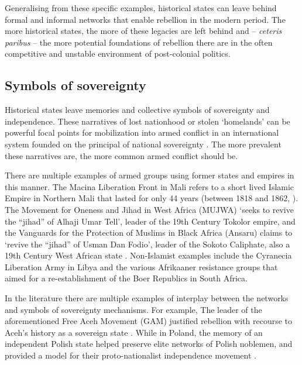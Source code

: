 Generalising from these specific examples, historical states can leave behind
formal and informal networks that enable rebellion in the modern period. The
more historical states, the more of these legacies are left behind and --
\textit{ceteris paribus} -- the more potential foundations of rebellion there
are in the often competitive and unstable environment of post-colonial politics. 

 
\subsection{Symbols of sovereignty}

Historical states leave memories and collective symbols of sovereignty and
independence. These narratives of lost nationhood or stolen `homelands' can be
powerful focal points for mobilization into armed conflict in an international
system founded on the principal of national sovereignty \citep{Ahram2019,
Shelef2016}. The more prevalent these narratives are, the more common armed
conflict should be.  

There are multiple examples of armed groups using former states and empires in
this manner. The Macina Liberation Front in Mali refers to a short lived Islamic
Empire in Northern Mali that lasted for only 44 years (between 1818 and 1862,
\citep{Brown1968}). The Movement for Oneness and Jihad in West Africa (MUJWA)
`seeks to revive the “jihad” of Alhaji Umar Tell', leader of the 19th Century
Tokolor empire, and the Vanguards for the Protection of Muslims in Black Africa
(Ansaru) claims to `revive the “jihad” of Usman Dan Fodio', leader of the Sokoto
Caliphate, also a 19th Century West African state \citep{Zenn2015}. Non-Islamist
examples include the Cyranecia Liberation Army in Libya and the various
Afrikaaner resistance groups that aimed for a re-establishment of the Boer
Republics in South Africa. 

In the literature there are multiple examples of interplay between the
networks and symbols of sovereignty mechanisms. For example, The leader of the
aforementioned Free Aceh Movement (GAM) justified rebellion with recourse to
Aceh's history as a sovereign state \citep{Aspinall2009}. While in Poland, the
memory of an independent Polish state helped preserve elite networks of Polish
noblemen, and provided a model for their proto-nationalist independence movement
\citep{Wimmer2018}.

